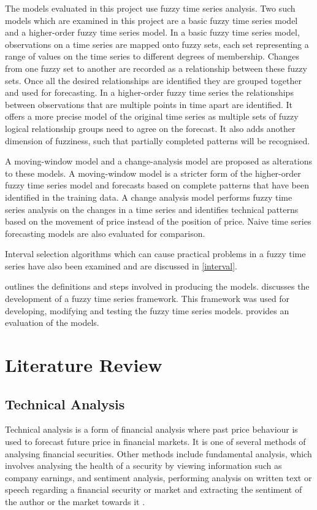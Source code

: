\documentclass[12pt, oneside, a4paper]{article}
\theoremstyle{definition}
\begin{document}
The models evaluated in this project use fuzzy time series analysis. Two such models which are examined in this project are a basic fuzzy time series model and a higher-order fuzzy time series model. In a basic fuzzy time series model, observations on a time series are mapped onto fuzzy sets, each set representing a range of values on the time series to different degrees of membership. Changes from one fuzzy set to another are recorded as a relationship between these fuzzy sets. Once all the desired relationships are identified they are grouped together and used for forecasting. In a higher-order fuzzy time series the relationships between observations that are multiple points in time apart are identified. It offers a more precise model of the original time series as multiple sets of fuzzy logical relationship groups need to agree on the forecast. It also adds another dimension of fuzziness, such that partially completed patterns will be recognised. 

A moving-window model and a change-analysis model are proposed as alterations to these models. A moving-window model is a stricter form of the higher-order fuzzy time series model and forecasts based on complete patterns that have been identified in the training data. A change analysis model performs fuzzy time series analysis on the changes in a time series and identifies technical patterns based on the movement of price instead of the position of price. Naive time series forecasting models are also evaluated for comparison. 

Interval selection algorithms which can cause practical problems in a fuzzy time series have also been examined and are discussed in \cref{interval}.

 outlines the definitions and steps involved in producing the models.  discusses the development of a fuzzy time series framework. This framework was used for developing, modifying and testing the fuzzy time series models.  provides an evaluation of the models.

\section{Literature Review}

\subsection{Technical Analysis}
\label{ta}

Technical analysis is a form of financial analysis where past price behaviour is used to forecast future price in financial markets. It is one of several methods of analysing financial securities. Other methods include fundamental analysis, which involves analysing the health of a security by viewing information such as company earnings, and sentiment analysis, performing analysis on written text or speech regarding a financial security or market and extracting the sentiment of the author or the market towards it \citep{ahmad2011affective}.
\end{document}
